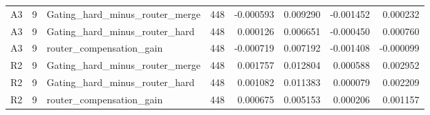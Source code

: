 \begin{tabular}{lrlrrrrr}
A3 & 9 & Gating_hard_minus_router_merge & 448 & -0.000593 & 0.009290 & -0.001452 & 0.000232 \\
A3 & 9 & Gating_hard_minus_router_hard & 448 & 0.000126 & 0.006651 & -0.000450 & 0.000760 \\
A3 & 9 & router_compensation_gain & 448 & -0.000719 & 0.007192 & -0.001408 & -0.000099 \\
R2 & 9 & Gating_hard_minus_router_merge & 448 & 0.001757 & 0.012804 & 0.000588 & 0.002952 \\
R2 & 9 & Gating_hard_minus_router_hard & 448 & 0.001082 & 0.011383 & 0.000079 & 0.002209 \\
R2 & 9 & router_compensation_gain & 448 & 0.000675 & 0.005153 & 0.000206 & 0.001157 \\
\bottomrule
\end{tabular}
